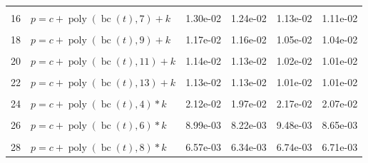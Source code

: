 \documentclass[12pt,a4paper]{article}
\DeclareMathOperator{\bc}{bc}
\DeclareMathOperator{\poly}{poly}
\begin{document}
\begin{longtable}[t]{ll>{\raggedleft\arraybackslash}p{2cm}>{\raggedleft\arraybackslash}p{2cm}>{\raggedleft\arraybackslash}p{2cm}>{\raggedleft\arraybackslash}p{2cm}}
\cellcolor{gray!6}{15} & \cellcolor{gray!6}{$p = c + \poly\left( \bc(t), 6 \right) + k$} & \cellcolor{gray!6}{1.35e-02} & \cellcolor{gray!6}{1.30e-02} & \cellcolor{gray!6}{1.26e-02} & \cellcolor{gray!6}{1.19e-02}\\
16 & $p = c + \poly\left( \bc(t), 7 \right) + k$ & 1.30e-02 & 1.24e-02 & 1.13e-02 & 1.11e-02\\
\cellcolor{gray!6}{17} & \cellcolor{gray!6}{$p = c + \poly\left( \bc(t), 8 \right) + k$} & \cellcolor{gray!6}{1.18e-02} & \cellcolor{gray!6}{1.17e-02} & \cellcolor{gray!6}{1.04e-02} & \cellcolor{gray!6}{1.04e-02}\\
18 & $p = c + \poly\left( \bc(t), 9 \right) + k$ & 1.17e-02 & 1.16e-02 & 1.05e-02 & 1.04e-02\\
\cellcolor{gray!6}{19} & \cellcolor{gray!6}{$p = c + \poly\left( \bc(t), 10 \right) + k$} & \cellcolor{gray!6}{1.14e-02} & \cellcolor{gray!6}{1.14e-02} & \cellcolor{gray!6}{1.02e-02} & \cellcolor{gray!6}{1.01e-02}\\
20 & $p = c + \poly\left( \bc(t), 11 \right) + k$ & 1.14e-02 & 1.13e-02 & 1.02e-02 & 1.01e-02\\
\cellcolor{gray!6}{21} & \cellcolor{gray!6}{$p = c + \poly\left( \bc(t), 12 \right) + k$} & \cellcolor{gray!6}{1.14e-02} & \cellcolor{gray!6}{1.13e-02} & \cellcolor{gray!6}{1.01e-02} & \cellcolor{gray!6}{1.01e-02}\\
22 & $p = c + \poly\left( \bc(t), 13 \right) + k$ & 1.13e-02 & 1.13e-02 & 1.01e-02 & 1.01e-02\\
\cellcolor{gray!6}{23} & \cellcolor{gray!6}{$p = c + \poly\left( \bc(t), 3 \right) * k$} & \cellcolor{gray!6}{2.79e-02} & \cellcolor{gray!6}{1.89e-02} & \cellcolor{gray!6}{1.98e-02} & \cellcolor{gray!6}{1.87e-02}\\
24 & $p = c + \poly\left( \bc(t), 4 \right) * k$ & 2.12e-02 & 1.97e-02 & 2.17e-02 & 2.07e-02\\
\cellcolor{gray!6}{25} & \cellcolor{gray!6}{$p = c + \poly\left( \bc(t), 5 \right) * k$} & \cellcolor{gray!6}{1.62e-02} & \cellcolor{gray!6}{1.59e-02} & \cellcolor{gray!6}{1.38e-02} & \cellcolor{gray!6}{1.36e-02}\\
26 & $p = c + \poly\left( \bc(t), 6 \right) * k$ & 8.99e-03 & 8.22e-03 & 9.48e-03 & 8.65e-03\\
\cellcolor{gray!6}{27} & \cellcolor{gray!6}{$p = c + \poly\left( \bc(t), 7 \right) * k$} & \cellcolor{gray!6}{8.27e-03} & \cellcolor{gray!6}{7.42e-03} & \cellcolor{gray!6}{7.97e-03} & \cellcolor{gray!6}{7.69e-03}\\
28 & $p = c + \poly\left( \bc(t), 8 \right) * k$ & 6.57e-03 & 6.34e-03 & 6.74e-03 & 6.71e-03\\

\end{longtable}
\end{document}
